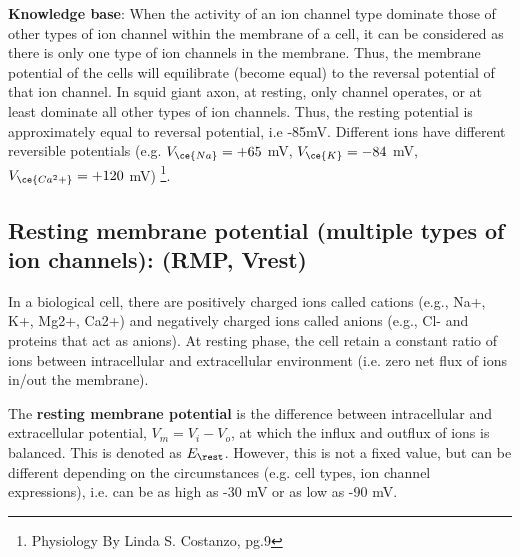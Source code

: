 \begin{mdframed}
  {\bf Knowledge base}: When the activity of an ion channel type
  dominate those of other types of ion channel within the membrane of a
  cell, it can be considered as there is only one type of ion channels
  in the membrane. Thus, the membrane potential of the cells will
  equilibrate (become equal) to the reversal potential of that ion
  channel. In squid giant axon, at resting, only  channel
  operates, or at least dominate all other types of ion channels. Thus,
  the resting potential is approximately equal to  reversal
  potential, i.e -85mV.  Different ions have different reversible
  potentials (e.g. $V_{\ce{Na}}=+65$ mV, $V_{\ce{K}}=-84$ mV, $V_{\ce{Ca^2+}} = +120$ mV)
  \footnote{Physiology By Linda S. Costanzo, pg.9}.
\end{mdframed}

\subsection[Multiple types of ion channels]{Resting membrane potential
(multiple types of ion channels): (RMP, Vrest)}
\label{sec:meas-rest-potent}

In a biological cell, there are positively charged ions called cations (e.g.,
Na+, K+, Mg2+, Ca2+) and negatively charged ions called anions (e.g., Cl- and
proteins that act as anions). 
At resting phase, the cell retain a constant ratio of ions between intracellular
and extracellular environment (i.e. zero net flux of ions in/out the membrane).

The {\bf resting membrane potential} is the difference between intracellular and
extracellular potential, $V_m = V_i - V_o$, at which the influx and outflux of
ions is balanced. This is denoted as $E_\rest$. However, this is not a fixed
value, but can be different depending on the circumstances (e.g. cell types, ion
channel expressions), i.e. can be as high as -30 mV or as low as -90 mV.

